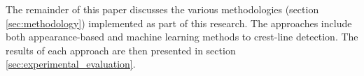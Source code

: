 The remainder of this paper discusses the various methodologies (section \ref{sec:methodology}) implemented as part of this research. The approaches include both appearance-based and machine learning methods to crest-line detection. The results of each approach are then presented in section \ref{sec:experimental_evaluation}.


